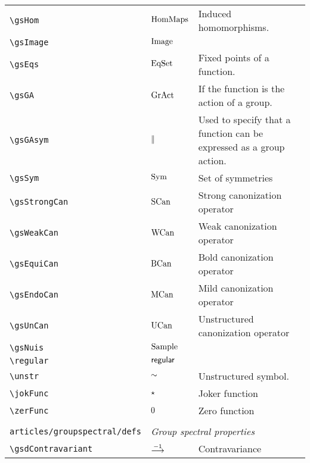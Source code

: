 \begin{longtable}{lll}
 \hline
{\color[rgb]{0.5,0.5,0.5}\texttt{\textbackslash gsHom}} & $\text{HomMaps}$ &  Induced homomorphisms.\\ 
 {\color[rgb]{0.5,0.5,0.5}\texttt{\textbackslash gsImage}} & $\text{Image}$ &  \\ 
 {\color[rgb]{0.5,0.5,0.5}\texttt{\textbackslash gsEqs}} & $\text{EqSet}$ &  Fixed points of a function.\\ 
 {\color[rgb]{0.5,0.5,0.5}\texttt{\textbackslash gsGA}} & $\text{GrAct}$ &  If the function is the action of a group.\\ 
 {\color[rgb]{0.5,0.5,0.5}\texttt{\textbackslash gsGAsym}} & $\parallel$ &  Used to specify that a function can be expressed as a group action.\\ 
 {\color[rgb]{0.5,0.5,0.5}\texttt{\textbackslash gsSym}} & $\text{Sym}$ &  Set of symmetries\\ 
 {\color[rgb]{0.5,0.5,0.5}\texttt{\textbackslash gsStrongCan}} & $\text{SCan}$ &  Strong canonization operator\\ 
 {\color[rgb]{0.5,0.5,0.5}\texttt{\textbackslash gsWeakCan}} & $\text{WCan}$ &  Weak canonization operator\\ 
 {\color[rgb]{0.5,0.5,0.5}\texttt{\textbackslash gsEquiCan}} & $\text{BCan}$ &  Bold canonization operator\\ 
 {\color[rgb]{0.5,0.5,0.5}\texttt{\textbackslash gsEndoCan}} & $\text{MCan}$ &  Mild canonization operator\\ 
 {\color[rgb]{0.5,0.5,0.5}\texttt{\textbackslash gsUnCan}} & $\text{UCan}$ &  Unstructured canonization operator\\ 
 {\color[rgb]{0.5,0.5,0.5}\texttt{\textbackslash gsNuis}} & $\text{Sample}$ &  \\ 
 {\color[rgb]{0.5,0.5,0.5}\texttt{\textbackslash regular}} & $\mathsf{regular}$ & \\ 
 {\color[rgb]{0.5,0.5,0.5}\texttt{\textbackslash unstr}} & $\sim$ &  Unstructured symbol.\\ 
 {\color[rgb]{0.5,0.5,0.5}\texttt{\textbackslash jokFunc}} & $\star$ &  Joker function\\ 
 {\color[rgb]{0.5,0.5,0.5}\texttt{\textbackslash zerFunc}} & $0$ &  Zero function\\ 
  &  & \\ 
 {\color[rgb]{0.5,0.5,0.5}\texttt{articles/groupspectral/defs}} & \multicolumn{2}{l}{\emph{Group spectral properties}}\\ 
 \hline
{\color[rgb]{0.5,0.5,0.5}\texttt{\textbackslash gsdContravariant}} & $\stackrel{-1}{\longrightarrow}$ &  Contravariance\\ 

\end{longtable}
